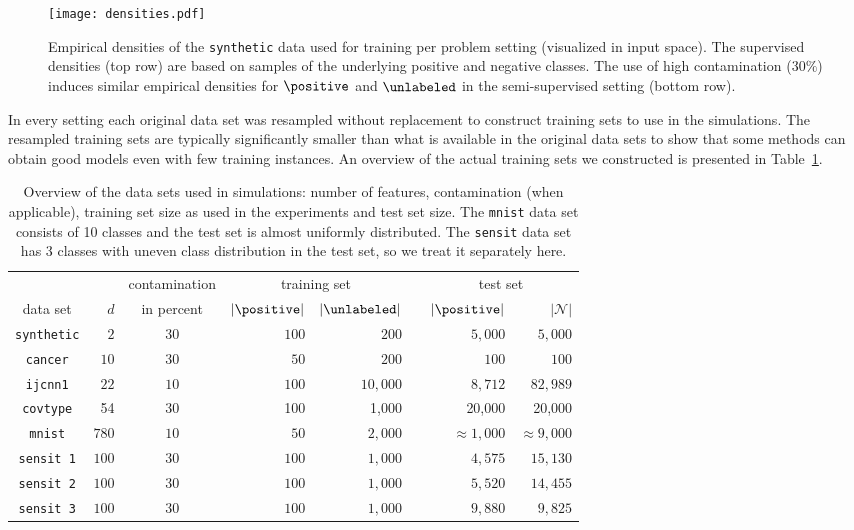 \begin{figure}[!h]
  \centering
  \texttt{[image: densities.pdf]}
  \caption{Empirical densities of the \texttt{synthetic} data used for training per problem setting (visualized in input space). The supervised densities (top row) are based on samples of the underlying positive and negative classes. The use of high contamination ($30\%$) induces similar empirical densities for $\positive$ and $\unlabeled$ in the semi-supervised setting (bottom row).} %
  \label{fig:densities}
\end{figure}


In every setting each original data set was resampled without replacement to construct training sets to use in the simulations. The resampled training sets are typically significantly smaller than what is available in the original data sets to show that some methods can obtain good models even with few training instances. An overview of the actual training sets we constructed is presented in Table~\ref{table:datasets}. 


\begin{table}[!ht]
\centering
\begin{tabular}{crcrrcrr}
\toprule
 & & contamination & \multicolumn{2}{c}{training set} & & \multicolumn{2}{c}{test set} \\ \cline{4-5} \cline{7-8}
data set & $d$ & in percent & $|\positive|$ & $|\unlabeled|$ & & $|\positive|$ & $|\mathcal{N}|$ \\
\midrule
\texttt{synthetic} & $2$ & $30$ & $100$ & $200$ & & $5,000$ & $5,000$ \\
\texttt{cancer} & $10$ & $30$   & $50$ & $200$ & & $100$ & $100$ \\
\texttt{ijcnn1} & $22$ & $10$   & $100$ & $10,000$ & & $8,712$ & $82,989$ \\
\texttt{covtype} & 54 & 30 & 100 & 1,000 & & 20,000 & 20,000 \\
\texttt{mnist} & $780$ & $10$   & $50$ & $2,000$ & & $\approx1,000$ & $\approx9,000$ \\
\texttt{sensit 1} & $100$ & $30$  & $100$ & $1,000$ & & $4,575$ & $15,130$ \\
\texttt{sensit 2} & $100$ & $30$  & $100$ & $1,000$ & & $5,520$ & $14,455$ \\
\texttt{sensit 3} & $100$ & $30$  & $100$ & $1,000$ & & $9,880$ & $9,825$ \\
\bottomrule
\end{tabular}
\caption{Overview of the data sets used in simulations: number of features, contamination (when applicable), training set size as used in the experiments and test set size. The \texttt{mnist} data set consists of 10 classes and the test set is almost uniformly distributed. The \texttt{sensit} data set has 3 classes with uneven class distribution in the test set, so we treat it separately here.}

\label{table:datasets}
\end{table}


